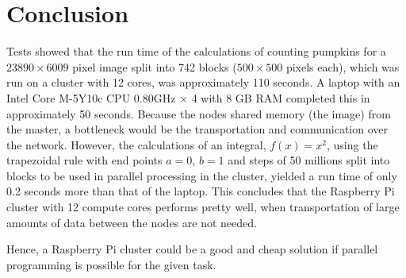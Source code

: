 \documentclass[../Head/Report.tex]{subfiles}
\begin{document}
\section{Conclusion}
Tests showed that the run time of the calculations of counting pumpkins for a $23890 \times 6009$ pixel image split into 742 blocks ($500 \times500$ pixels each), which was run on a cluster with 12 cores, was approximately 110 seconds. A laptop with an Intel Core M-5Y10c CPU 0.80GHz $\times $ 4 with 8 GB RAM completed this in approximately 50 seconds. Because the nodes shared memory (the image) from the master, a bottleneck would be the transportation and communication over the network. However, the calculations of an integral, $f(x) = x^2$, using the trapezoidal rule with end points $a=0$, $b=1$ and steps of 50 millions split into blocks to be used in parallel processing in the cluster, yielded a run time of only 0.2 seconds more than that of the laptop. This concludes that the  Raspberry Pi cluster with 12 compute cores performs pretty well, when transportation of large amounts of data between the nodes are not needed. 

Hence, a Raspberry Pi cluster could be a good and cheap solution if parallel programming is possible for the given task.  
\end{document}

